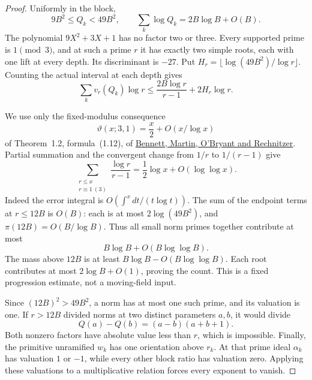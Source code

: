 \begin{proof}
Uniformly in the block,
\[
 9B^2\leq Q_k<49B^2,\qquad
 \sum_k\log Q_k=2B\log B+O(B).
\]
The polynomial \(9X^2+3X+1\) has no factor two or three.
Every supported prime is \(1\pmod3\), and at such a prime \(r\)
it has exactly two simple roots, each with one lift at every
depth. Its discriminant is \(-27\).
Put \(H_r=\lfloor\log(49B^2)/\log r\rfloor\).
Counting the actual interval at each depth gives
\[
 \sum_k v_r(Q_k)\log r
     \leq\frac{2B\log r}{r-1}+2H_r\log r.
\]

We use only the fixed-modulus consequence
\[
 \vartheta(x;3,1)=\frac x2+O(x/\log x)
\]
of Theorem~1.2, formula~(1.12), of
\href{https://arxiv.org/abs/1802.00085v3}
{Bennett, Martin, O'Bryant and Rechnitzer}.
Partial summation and the convergent change from \(1/r\) to
\(1/(r-1)\) give
\[
 \sum_{\substack{r\leq x\\r\equiv1\ (3)}}\frac{\log r}{r-1}
       =\frac12\log x+O(\log\log x).
\]
Indeed the error integral is \(O(\int^x dt/(t\log t))\).
The sum of the endpoint terms at \(r\leq12B\) is \(O(B)\):
each is at most \(2\log(49B^2)\), and
\(\pi(12B)=O(B/\log B)\). Thus all small norm primes together
contribute at most
\[
 B\log B+O(B\log\log B).
\]
The mass above \(12B\) is at least
\(B\log B-O(B\log\log B)\).
Each root contributes at most \(2\log B+O(1)\), proving the count.
This is a fixed progression estimate, not a moving-field input.

Since \((12B)^2>49B^2\), a norm has at most one such prime,
and its valuation is one. If \(r>12B\) divided norms at two
distinct parameters \(a,b\), it would divide
\[
 Q(a)-Q(b)=(a-b)(a+b+1).
\]
Both nonzero factors have absolute value less than \(r\), which
is impossible. Finally, the primitive unramified \(w_k\) has
one orientation above \(r_k\). At that prime ideal \(\alpha_k\)
has valuation \(1\) or \(-1\), while every other block ratio
has valuation zero. Applying these valuations to a multiplicative
relation forces every exponent to vanish.
\end{proof}

